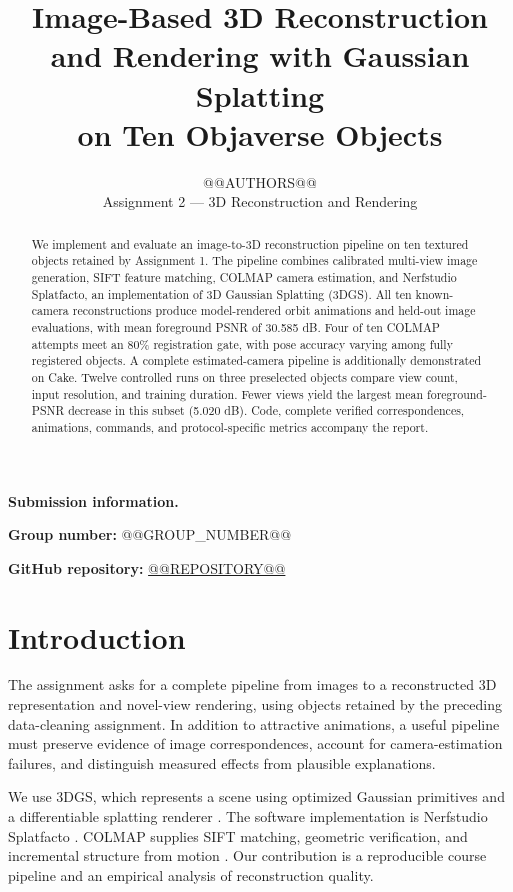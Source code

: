\documentclass{article}
\title{Image-Based 3D Reconstruction\\and Rendering with Gaussian Splatting\\on Ten Objaverse Objects}
\author{@@AUTHORS@@\\Assignment 2 --- 3D Reconstruction and Rendering}
\begin{document}
\maketitle
{}

\begin{abstract}
We implement and evaluate an image-to-3D reconstruction pipeline on ten textured objects retained by Assignment 1. The pipeline combines calibrated multi-view image generation, SIFT feature matching, COLMAP camera estimation, and Nerfstudio Splatfacto, an implementation of 3D Gaussian Splatting (3DGS). All ten known-camera reconstructions produce model-rendered orbit animations and held-out image evaluations, with mean foreground PSNR of 30.585 dB. Four of ten COLMAP attempts meet an 80\% registration gate, with pose accuracy varying among fully registered objects. A complete estimated-camera pipeline is additionally demonstrated on Cake. Twelve controlled runs on three preselected objects compare view count, input resolution, and training duration. Fewer views yield the largest mean foreground-PSNR decrease in this subset (5.020 dB). Code, complete verified correspondences, animations, commands, and protocol-specific metrics accompany the report.
\end{abstract}

\noindent\textbf{Submission information.}\par\smallskip
\noindent\textbf{Group number:} @@GROUP_NUMBER@@\par\smallskip
\noindent\textbf{GitHub repository:} {\url{@@REPOSITORY@@}}\par\smallskip

\section{Introduction}
The assignment asks for a complete pipeline from images to a reconstructed 3D representation and novel-view rendering, using objects retained by the preceding data-cleaning assignment. In addition to attractive animations, a useful pipeline must preserve evidence of image correspondences, account for camera-estimation failures, and distinguish measured effects from plausible explanations.

We use 3DGS, which represents a scene using optimized Gaussian primitives and a differentiable splatting renderer \citep{kerbl2023}. The software implementation is Nerfstudio Splatfacto \citep{nerfstudio}. COLMAP supplies SIFT matching, geometric verification, and incremental structure from motion \citep{colmap}. Our contribution is a reproducible course pipeline and an empirical analysis of reconstruction quality.
\end{document}
